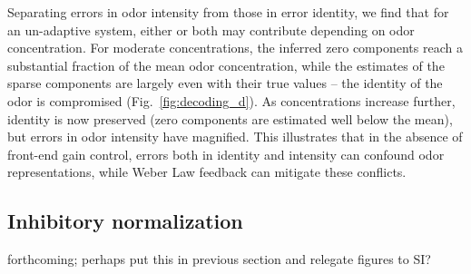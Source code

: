 Separating errors in odor intensity from those in error identity, we find that for an un-adaptive system, either or both may contribute depending on odor concentration. For moderate concentrations, the inferred zero components reach a substantial fraction of the mean odor concentration, while the estimates of the sparse components are largely even with their true values -- the identity of the odor is compromised (Fig.~\ref{fig:decoding_d}). As concentrations increase further, identity is now preserved (zero components are estimated well below the mean), but errors in odor intensity have magnified. This illustrates that in the absence of front-end gain control, errors both in identity and intensity can confound odor representations, while Weber Law feedback can mitigate these conflicts. 






\subsection{Inhibitory normalization}



{\color{blue} forthcoming; perhaps put this in previous section and relegate figures to SI?}





